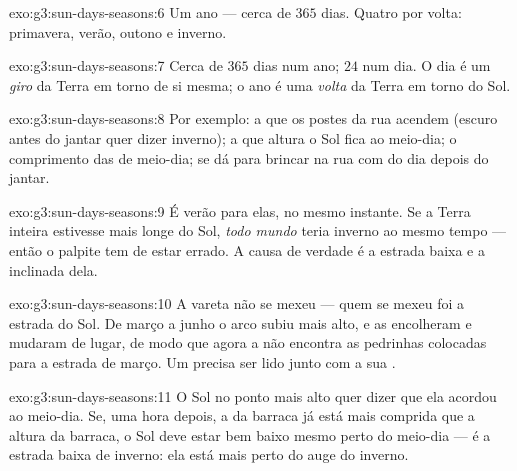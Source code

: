 \begin{solution}{exo:g3:sun-days-seasons:6}
Um ano --- cerca de $365$ dias. Quatro  por volta: primavera,
verão, outono e inverno.
\end{solution}

\begin{solution}{exo:g3:sun-days-seasons:7}
Cerca de $365$ dias num ano; $24$  num dia. O dia é um
\emph{giro} da Terra em torno de si mesma; o ano é uma \emph{volta}
da Terra em torno do Sol.
\end{solution}

\begin{solution}{exo:g3:sun-days-seasons:8}
Por exemplo: a que  os postes da rua acendem (escuro antes do
jantar quer dizer inverno); a que altura o Sol fica ao meio-dia; o
comprimento das  de meio-dia; se dá para brincar na rua com
 do dia depois do jantar.
\end{solution}

\begin{solution}{exo:g3:sun-days-seasons:9}
É verão para elas, no mesmo instante. Se a Terra inteira estivesse
mais longe do Sol, \emph{todo mundo} teria inverno ao mesmo tempo ---
então o palpite tem de estar errado. A causa de verdade é a estrada
baixa e a  inclinada dela.
\end{solution}

\begin{solution}{exo:g3:sun-days-seasons:10}
A vareta não se mexeu --- quem se mexeu foi a estrada do Sol. De
março a junho o arco subiu mais alto, e as  encolheram e
mudaram de lugar, de modo que agora a  não encontra as
pedrinhas colocadas para a estrada de março. Um 
precisa ser lido junto com a sua .
\end{solution}

\begin{solution}{exo:g3:sun-days-seasons:11}
O Sol no ponto mais alto quer dizer que ela acordou ao meio-dia. Se,
uma hora depois, a  da barraca já está mais comprida que a
altura da barraca, o Sol deve estar bem baixo mesmo perto do
meio-dia --- é a estrada baixa de inverno: ela está mais perto do
auge do inverno.
\end{solution}
